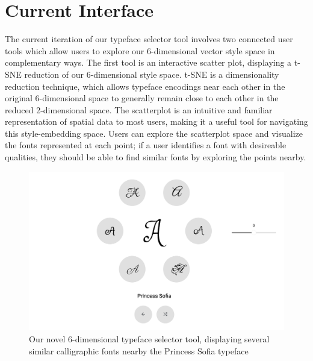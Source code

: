 \section{Current Interface}

The current iteration of our typeface selector tool involves two connected user tools which allow users to explore our 6-dimensional vector style space in complementary ways. The first tool is an interactive scatter plot, displaying a t-SNE reduction of our 6-dimensional style space. t-SNE \cite{vandermaaten2008} is a dimensionality reduction technique, which allows typeface encodings near each other in the original 6-dimensional space to generally remain close to each other in the reduced 2-dimensional space. The scatterplot is an intuitive and familiar representation of spatial data to most users, making it a useful tool for navigating this style-embedding space. Users can explore the scatterplot space and visualize the fonts represented at each point; if a user identifies a font with desireable qualities, they should be able to find similar fonts by exploring the points nearby.

\begin{figure}[h]
    \centering
    \includegraphics[width=\textwidth]{images/selector-tool.png}
    \caption{Our novel 6-dimensional typeface selector tool, displaying several similar calligraphic fonts nearby the Princess Sofia typeface}
    \label{fig:selector-tool}
\end{figure}


